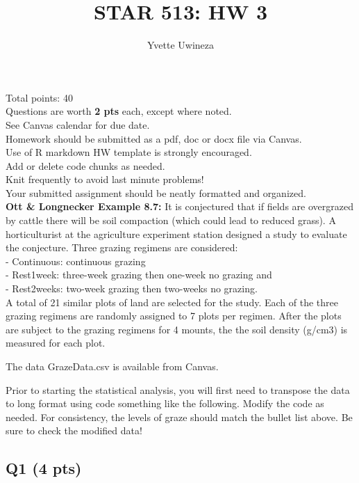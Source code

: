 \documentclass[
]{article}
\title{STAR 513: HW 3}
\author{Yvette Uwineza}
\date{}
\begin{document}
\maketitle

Total points: 40\\
Questions are worth \textbf{2 pts} each, except where noted.\\
See Canvas calendar for due date.\\

Homework should be submitted as a pdf, doc or docx file via Canvas.\\
Use of R markdown HW template is strongly encouraged.\\
Add or delete code chunks as needed.\\
Knit frequently to avoid last minute problems!\\
Your submitted assignment should be neatly formatted and organized.\\

\textbf{Ott \& Longnecker Example 8.7:} It is conjectured that if fields
are overgrazed by cattle there will be soil compaction (which could lead
to reduced grass). A horticulturist at the agriculture experiment
station designed a study to evaluate the conjecture. Three grazing
regimens are considered:\\
- Continuous: continuous grazing\\
- Rest1week: three-week grazing then one-week no grazing and\\
- Rest2weeks: two-week grazing then two-weeks no grazing.\\
A total of 21 similar plots of land are selected for the study. Each of
the three grazing regimens are randomly assigned to 7 plots per regimen.
After the plots are subject to the grazing regimens for 4 mounts, the
the soil density (g/cm3) is measured for each plot.

The data GrazeData.csv is available from Canvas.

Prior to starting the statistical analysis, you will first need to
transpose the data to long format using code something like the
following. Modify the code as needed. For consistency, the levels of
graze should match the bullet list above. Be sure to check the modified
data!

\hypertarget{q1-4-pts}{%
\subsection{Q1 (4 pts)}\label{q1-4-pts}}
\end{document}
